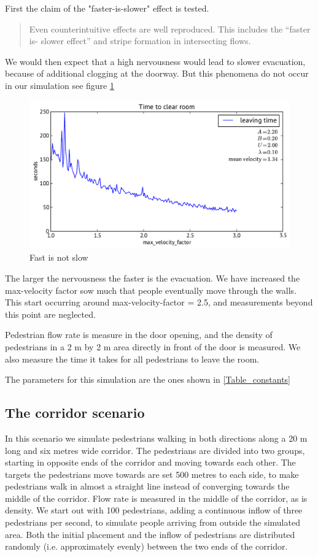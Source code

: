 First the claim of the "faster-is-slower" effect is tested.
\begin{quote}
Even counterintuitive
effects are well reproduced. This includes the “faster is-
slower effect” and stripe formation in intersecting flows. \cite{self-org}
\end{quote}
We would then expect that a high nervousness would lead to slower evacuation, because of additional clogging at the doorway. But this phenomena do not occur in our simulation see figure \ref{FastIsSlow}
\begin{figure}
\centering
\includegraphics[scale=0.5]{Figures/fastIsSlowNot}
\caption{Fast is not slow}
\label{FastIsSlow}
\end{figure}
The larger the nervousness the faster is the evacuation. We have increased the max-velocity factor sow much that people eventually move through the walls. This start occurring around max-velocity-factor = 2.5, and measurements beyond this point are neglected.

Pedestrian flow rate is measure in the door opening, and the density of pedestrians in a 2 m by 2 m area directly in front of the door is measured. We also measure the time it takes for all pedestrians to leave the room.

The parameters for this simulation are the ones shown in \ref{Table_constants}



\subsection{The corridor scenario}
In this scenario we simulate pedestrians walking in both directions along a 20 
m long and six metres wide corridor. The pedestrians are divided into two 
groups, starting in opposite ends of the corridor and moving towards each 
other. The targets the pedestrians move towards are set 500 metres to each 
side, to make pedestrians walk in almost a straight line instead of converging 
towards the middle of the corridor. Flow rate is measured in the middle of the 
corridor, as is density. We start out with 100 pedestrians, adding a 
continuous inflow of three pedestrians per second, to simulate people arriving 
from outside the simulated area. Both the initial placement and the inflow of 
pedestrians are distributed randomly (i.e. approximately evenly) between the 
two ends of the corridor.

